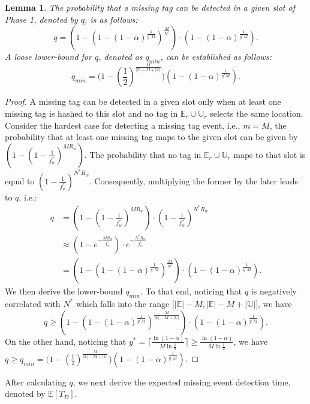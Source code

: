 \documentclass[10pt, twocolumn]{IEEEtran}
\newtheorem{lemma}{Lemma}
\begin{document}
\begin{lemma}
\label{Lem:Prob_de}
The probability that a missing tag can be detected in a given slot of Phase 1, denoted by $q$, is as follows:
\begin{equation}
q = \left( 1-(1-(1-\alpha)^{\frac{1}{y^*M}})^\frac{M}{N^*} \right) \cdot \left(1-(1-\alpha)^{\frac{1}{y^*M}}\right).
\end{equation}
A loose lower-bound for $q$, denoted as $q_{min}$, can be established as follows:
\begin{equation}
q_{min}=\big(1-(\frac{1}{2})^\frac{M}{|\mathbb{E}|-M+|\mathbb{U}|}\big)(1-(1-\alpha)^{\frac{1}{y^*M}}).
\label{eq:q_min}
\end{equation}
\end{lemma}

\begin{proof}
A missing tag can be detected in a given slot only when at least one missing tag is hashed to this slot and no tag in $\mathbb{E}_r \cup \mathbb{U}_r$ selects the same location. Consider the hardest case for detecting a missing tag event, i.e., $m=M$, the probability that at least one missing tag maps to the given slot can be given by $\left( 1- (1-\frac{1}{f^*_w})^{M R_w} \right)$. The probability that no tag in $\mathbb{E}_r \cup \mathbb{U}_r$ maps to that slot is equal to $(1-\frac{1}{f^*_w})^{N^* R_w}$. Consequently, multiplying the former by the later leads to $q$, i.e.:
\begin{align*}
q &= \left( 1- (1-\frac{1}{f^*_w})^{M R_w} \right)\cdot(1-\frac{1}{f^*_w})^{N^* R_w} \\
  &\approx (1-e^{-\frac{MR_w}{f^*_w}})\cdot e^{-\frac{N^*R_w}{f^*_w}} \\
  &= \left( 1-(1-(1-\alpha)^{\frac{1}{y^*M}})^\frac{M}{N^*} \right) \cdot (1-(1-\alpha)^{\frac{1}{y^*M}}).
\end{align*}
We then derive the lower-bound $q_{min}$. To that end, noticing that $q$ is negatively correlated with $N^*$ which falls into the range $\big[|\mathbb{E}|-M,|\mathbb{E}|-M+|\mathbb{U}|\big]$, we have
$$q\ge \left( 1-(1-(1-\alpha)^{\frac{1}{y^*M}})^\frac{M}{|\mathbb{E}|-M+|\mathbb{U}|} \right) \cdot (1-(1-\alpha)^{\frac{1}{y^*M}}).$$
On the other hand, noticing that $y^*=\lceil{\frac{\ln (1-\alpha)}{M\ln \frac{1}{2}}\rceil}\ge \frac{\ln (1-\alpha)}{M\ln \frac{1}{2}}$, we have $q\ge q_{min}=\big(1-(\frac{1}{2})^\frac{M}{|\mathbb{E}|-M+|\mathbb{U}|}\big)(1-(1-\alpha)^{\frac{1}{y^*M}})$.
\end{proof}

After calculating $q$, we next derive the expected missing event detection time, denoted by $\mathbb{E}[T_D]$.
\end{document}
